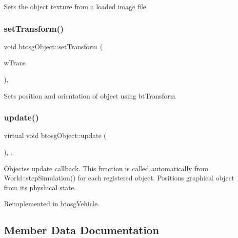 Sets the object texture from a loaded image file. \mbox{\label{classbtosgObject_ad33fcab26c0c83ccab6dca6906e8cdb0}} 
\subsubsection{\texorpdfstring{setTransform()}{setTransform()}}
{\footnotesize\ttfamily void btosg\+Object\+::set\+Transform (\begin{DoxyParamCaption}\item[{const bt\+Transform \&}]{w\+Trans }\end{DoxyParamCaption})\hspace{0.3cm}{\ttfamily [inline]}, {\ttfamily [inherited]}}

Sets position and orientation of object using bt\+Transform \mbox{\label{classbtosgObject_a342917817dfde62554f83da8e0d5110b}} 
\subsubsection{\texorpdfstring{update()}{update()}}
{\footnotesize\ttfamily virtual void btosg\+Object\+::update (\begin{DoxyParamCaption}{ }\end{DoxyParamCaption})\hspace{0.3cm}{\ttfamily [inline]}, {\ttfamily [virtual]}, {\ttfamily [inherited]}}

Objects\textquotesingle{}s update callback. This function is called automatically from World\+::step\+Simulation() for each registered object. Positions graphical object from its physhical state. 

Reimplemented in \mbox{\hyperlink{classbtosgVehicle_a5fd0f471df492ac232c9b772a28bd2b9}{btosg\+Vehicle}}.



\subsection{Member Data Documentation}
\mbox{\label{classbtosgObject_a64ccde0543c184ed1749fdb9c9699785}} 

